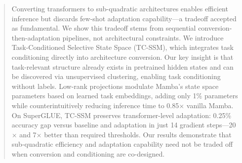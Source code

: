 \begin{abstract}
Converting transformers to sub-quadratic architectures enables efficient inference but discards few-shot adaptation capability---a tradeoff accepted as fundamental. We show this tradeoff stems from sequential conversion-then-adaptation pipelines, not architectural constraints. We introduce Task-Conditioned Selective State Space (TC-SSM), which integrates task conditioning directly into architecture conversion. Our key insight is that task-relevant structure already exists in pretrained hidden states and can be discovered via unsupervised clustering, enabling task conditioning without labels. Low-rank projections modulate Mamba's state space parameters based on learned task embeddings, adding only 1\% parameters while counterintuitively reducing inference time to 0.85$\times$ vanilla Mamba. On SuperGLUE, TC-SSM preserves transformer-level adaptation: 0.25\% accuracy gap versus baseline and adaptation in just 14 gradient steps---20$\times$ and 7$\times$ better than required thresholds. Our results demonstrate that sub-quadratic efficiency and adaptation capability need not be traded off when conversion and conditioning are co-designed.
\end{abstract}
